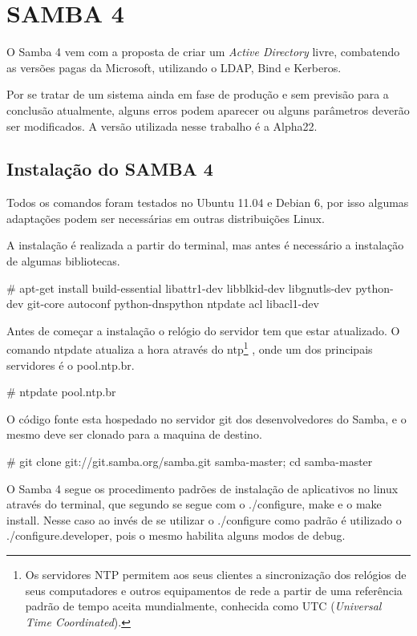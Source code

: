 \chapter{SAMBA 4}

O Samba 4 vem com a proposta de criar um \textit{Active Directory} livre, combatendo as versões pagas da Microsoft, utilizando o LDAP, Bind e Kerberos.

Por se tratar de um sistema ainda em fase de produção e sem previsão para a conclusão atualmente, alguns erros podem aparecer ou alguns parâmetros deverão ser modificados. A versão utilizada nesse trabalho é a Alpha22.

\section{Instalação do SAMBA 4}

Todos os comandos foram testados no Ubuntu 11.04 e Debian 6, por isso algumas adaptações podem ser necessárias em outras distribuições Linux.

A instalação é realizada a partir do terminal, mas antes é necessário a instalação de algumas bibliotecas.

	\# apt-get install build-essential libattr1-dev libblkid-dev libgnutls-dev python-dev git-core autoconf python-dnspython ntpdate acl libacl1-dev

Antes de começar a instalação o relógio do servidor tem que estar atualizado. O comando ntpdate atualiza a hora através do  ntp\footnote[2]{Os servidores NTP permitem aos seus clientes a sincronização dos relógios de seus computadores e outros equipamentos de rede a partir de uma referência padrão de tempo aceita mundialmente, conhecida como UTC (\textit{Universal Time Coordinated}).\cite{RNP}} , onde um dos principais servidores é o pool.ntp.br.

\# ntpdate pool.ntp.br

O código fonte esta hospedado no servidor git dos desenvolvedores do Samba, e o mesmo deve ser clonado para a maquina de destino.

\# git clone git://git.samba.org/samba.git samba-master; cd samba-master

O Samba 4 segue os procedimento padrões de instalação de aplicativos no linux através do terminal, que segundo \cite{INSTALL} se segue com o ./configure, make e o make install. Nesse caso ao invés de se utilizar o ./configure como padrão é utilizado o ./configure.developer, pois o mesmo habilita alguns modos de debug.

